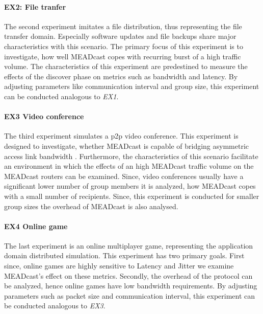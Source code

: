 \paragraph{EX2: File tranfer} %
\label{par:EX2: File tranfer}
The second experiment imitates a file distribution, thus representing the
    file transfer domain.
Especially software updates and file backups share major characteristics with
    this scenario.
The primary focus of this experiment is to investigate, how well MEADcast copes
    with recurring burst of a high traffic volume.
The characteristics of this experiment are predestined to measure the effects
    of the discover phase on metrics such as bandwidth and latency.
By adjusting parameters like communication interval and group size, this
    experiment can be conducted analogous to \textit{EX1}.

\paragraph{EX3 Video conference} %
\label{par:EX3 Video conference}
The third experiment simulates a \gls{p2p} video conference.
This experiment is designed to investigate, whether MEADcast is capable of
    bridging asymmetric access link bandwidth \cite{xcast_rfc,cartesian_us_bw}.
Furthermore, the characteristics of this scenario facilitate an environment
    in which the effects of an high MEADcast traffic volume on the MEADcast 
    routers can be examined.
Since, video conferences usually have a significant lower number of group
    members it is analyzed, how MEADcast copes with a small number of
    recipients.
Since, this experiment is conducted for smaller group sizes the overhead of 
    MEADcast is also analysed.

\paragraph{EX4 Online game} %
\label{par:EX4 Online game}
The last experiment is an online multiplayer game, representing the application
    domain distributed simulation.
This experiment has two primary goals.
First since, online games are highly sensitive to Latency and Jitter we examine
    MEADcast's effect on these metrics.
Secondly, the overhead of the protocol can be analyzed, hence online games have
    low bandwidth requirements.
By adjusting parameters such as packet size and communication interval, this
    experiment can be conducted analogous to \textit{EX3}.

